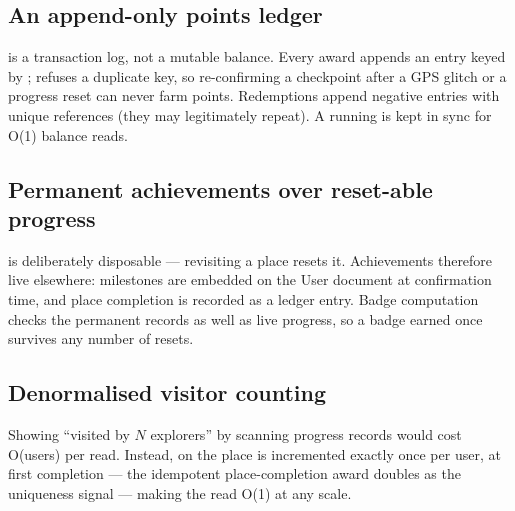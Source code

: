 \subsection{An append-only points ledger}
 is a transaction log, not a mutable balance. Every award
appends an entry keyed by ; 
refuses a duplicate key, so re-confirming a checkpoint after a GPS glitch
or a progress reset can never farm points. Redemptions append negative
entries with unique references (they may legitimately repeat). A running
 is kept in sync for O(1) balance reads.

\subsection{Permanent achievements over reset-able progress}
 is deliberately disposable --- revisiting a place resets
it. Achievements therefore live elsewhere: milestones are embedded on the
User document at confirmation time, and place completion is recorded as a
 ledger entry. Badge computation checks the permanent
records as well as live progress, so a badge earned once survives any
number of resets.

\subsection{Denormalised visitor counting}
Showing ``visited by $N$ explorers'' by scanning progress records would
cost O(users) per read. Instead,  on the place is
incremented exactly once per user, at first completion --- the idempotent
place-completion award doubles as the uniqueness signal --- making the read
O(1) at any scale.

